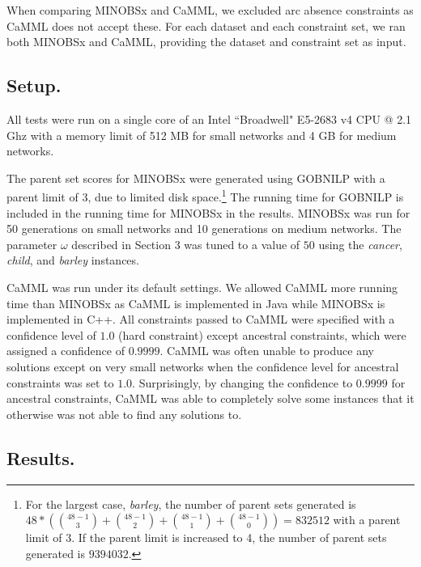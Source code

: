 \documentclass[twoside,11pt]{article}
\begin{document}
When comparing MINOBSx and CaMML, we excluded arc absence constraints as CaMML does not accept these. 
For each dataset and each constraint set, we ran both MINOBSx and CaMML, providing the dataset and constraint set as input. 

\subsection{Setup.}

All tests were run on a single core of an Intel ``Broadwell" E5-2683 v4 CPU @ 2.1 Ghz with a memory limit of 512 MB for small networks and 4 GB for medium networks. 

\smallskip
The parent set scores for MINOBSx were generated using GOBNILP \citep{Bartlett2017} with a parent limit of 3, due to limited disk space.\footnote{For the largest case, \emph{barley}, the number of parent sets
generated is $48*({48-1 \choose 3} + {48-1 \choose 2} + {48-1 \choose 1} + {48-1 \choose 0}) = 832512$ with a parent limit of 3. If the parent limit is increased to 4, the number of parent sets generated is $9394032$.}
The running time for GOBNILP is included in 
the running time for MINOBSx in the results. MINOBSx was run for 50 generations on small networks and 10 generations on medium networks. The parameter
$\omega$ described in Section 3 was tuned to a value of $50$ using the \emph{cancer}, \emph{child}, and \emph{barley} instances. 

\smallskip
CaMML was run under its default settings. We allowed CaMML more running time than MINOBSx as CaMML
is implemented in Java while MINOBSx is implemented in C++. All constraints passed to CaMML were specified with a confidence level of $1.0$ (hard constraint) except ancestral constraints, which were assigned a confidence of $0.9999$. CaMML was often unable to produce any solutions except on very small networks when the 
confidence level for ancestral constraints was set to $1.0$. Surprisingly, by changing the confidence to $0.9999$ for ancestral constraints, CaMML was able to completely solve
some instances that it otherwise was not able to find any solutions to. 

\subsection{Results.}
\end{document}
